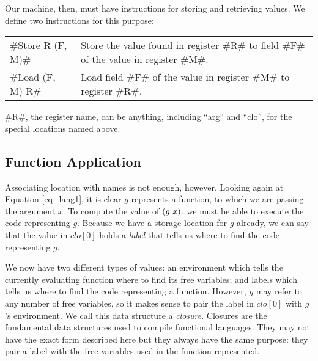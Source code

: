 \documentclass[12pt]{report}
\begin{document}
Our machine, then, must have instructions for storing and retrieving
values. We define two instructions for this purpose:
\begin{center}
  \begin{tabular}{lp{4in}}
    #Store R (F, M)# & Store the value found in register #R# to field %
    #F# of the value in register #M#. \\
    #Load (F, M) R# & Load field #F# of the value in register #M# to register #R#. \\
  \end{tabular}
\end{center}

#R#, the register name, can be anything, including ``arg'' and ``clo'', for the special locations named above.

\subsection{Function Application}

Associating location with names is not enough, however. Looking again
at Equation \ref{eq_lang1}, it is clear $g$ represents a function, to
which we are passing the argument $x$. To compute the value of
$(g\ x)$, we must be able to execute the code representing
$g$. Because we have a storage location for $g$ already, we can
say that the value in $clo[0]$ holds a \emph{label} that tells us
where to find the code representing $g$. 

We now have two different types of values: an environment which tells
the currently evaluating function where to find its free variables;
and labels which tells us where to find the code representing a
function. However, $g$ may refer to any number of free variables, so
it makes sense to pair the label in $clo[0]$ with $g$'s
environment. We call this data structure a \emph{closure}. Closures
are the fundamental data structures used to compile functional
languages. They may not have the exact form described here but they
always have the same purpose: they pair a label with the free
variables used in the function represented.
\end{document}
